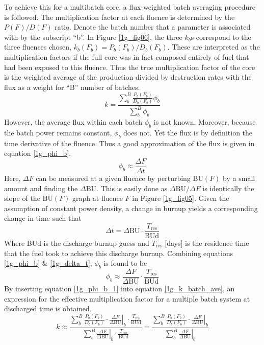 To achieve this for a multibatch core, a flux-weighted batch averaging procedure is followed.  
The multiplication factor at each fluence is determined by the $P(F)/D(F)$ ratio.  Denote the batch 
number that a parameter is associated with by the subscript ``b''.  In Figure \ref{1g_fig06}, 
the three $k_b$s correspond to the three fluences chosen,  $k_b(F_b) = P_b(F_b)/D_b(F_b)$.  
These are interpreted as the multiplication factors if the full core was in fact composed entirely 
of fuel that had been exposed to this fluence. Thus the true multiplication factor of the core is 
the weighted average of the production divided by destruction rates with the flux as a weight for 
``B'' number of batches.
\begin{equation}
\label{1g_k_batch_ave}
k = \frac{\sum_b^B \frac{P_b(F_b)}{D_b(F_b)} \phi_b}{\sum_b^B \phi_b}
\end{equation}
However, the average flux within each batch $\phi_b$ is not known.  
Moreover, because the batch power remains constant, $\phi_b$ does not.  Yet the flux is by definition the time 
derivative of the fluence. Thus a good approximation of the flux is given in equation \ref{1g_phi_b}.
\begin{equation}
\label{1g_phi_b}
\phi_b \approx \frac{\Delta F}{\Delta t}
\end{equation}
Here, $\Delta F$ can be measured at a given fluence by perturbing $\mbox{BU}(F)$ by a small amount 
and finding the $\Delta\mbox{BU}$.  This is easily done as $\Delta\mbox{BU}/\Delta F$ is identically 
the slope of the $\mbox{BU}(F)$ graph at fluence $F$ in Figure \ref{1g_fig05}.  Given the 
assumption of constant power density, a change in burnup yields a corresponding change in time such that
\begin{equation}
\label{1g_delta_t}
\Delta t = \Delta\mbox{BU} \cdot \frac{T_{\mbox{res}}}{\mbox{BUd}}
\end{equation}
Where BUd is the discharge burnup guess and $T_{\mbox{res}}$ [days] is the residence time that the 
fuel took to achieve this discharge burnup. Combining equations \ref{1g_phi_b} \& \ref{1g_delta_t}, 
$\phi_b$ is found to be
\begin{equation}
\label{1g_phi_b_1}
\phi_b \approx \frac{\Delta F}{\Delta \mbox{BU}} \cdot \frac{T_{\mbox{res}}}{\mbox{BUd}}
\end{equation}
By inserting equation \ref{1g_phi_b_1} into equation \ref{1g_k_batch_ave}, an expression for the effective 
multiplication factor for a multiple batch system at discharged time is obtained.
\begin{equation}
\label{1g_k_batch_ave_1}
k \approx \frac{\sum_b^B \frac{P_b(F_b)}{D_b(F_b)} \cdot \left. \frac{\Delta F}{\Delta \mbox{BU}} \right|_b \cdot \frac{T_{\mbox{res}}}{\mbox{BUd}}}
                {\sum_b^B \left. \frac{\Delta F}{\Delta \mbox{BU}} \right|_b \cdot \frac{T_{\mbox{res}}}{\mbox{BUd}}}
 =  \frac{\sum_b^B \frac{P_b(F_b)}{D_b(F_b)} \cdot \left. \frac{\Delta F}{\Delta \mbox{BU}} \right|_b }
                {\sum_b^B \left. \frac{\Delta F}{\Delta \mbox{BU}} \right|_b}
\end{equation}

